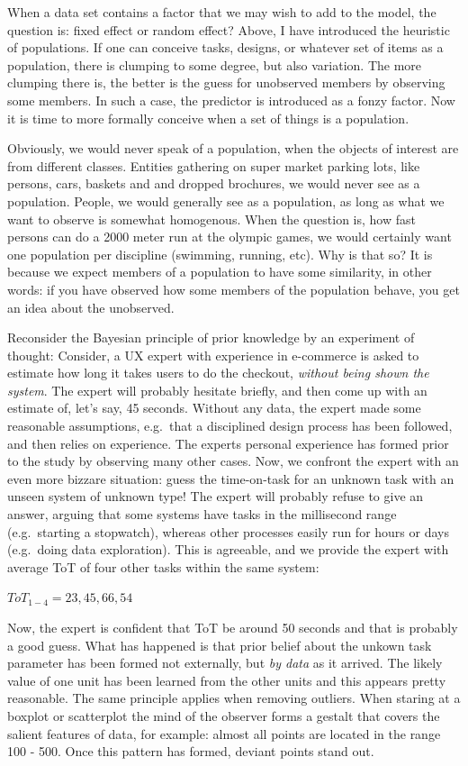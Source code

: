 \documentclass[]{svmono}
\begin{document}
When a data set contains a factor that we may wish to add to the model,
the question is: fixed effect or random effect? Above, I have introduced
the heuristic of populations. If one can conceive tasks, designs, or
whatever set of items as a population, there is clumping to some degree,
but also variation. The more clumping there is, the better is the guess
for unobserved members by observing some members. In such a case, the
predictor is introduced as a fonzy factor. Now it is time to more
formally conceive when a set of things is a population.

Obviously, we would never speak of a population, when the objects of
interest are from different classes. Entities gathering on super market
parking lots, like persons, cars, baskets and and dropped brochures, we
would never see as a population. People, we would generally see as a
population, as long as what we want to observe is somewhat homogenous.
When the question is, how fast persons can do a 2000 meter run at the
olympic games, we would certainly want one population per discipline
(swimming, running, etc). Why is that so? It is because we expect
members of a population to have some similarity, in other words: if you
have observed how some members of the population behave, you get an idea
about the unobserved.

Reconsider the Bayesian principle of prior knowledge by an experiment of
thought: Consider, a UX expert with experience in e-commerce is asked to
estimate how long it takes users to do the checkout, \emph{without being
shown the system}. The expert will probably hesitate briefly, and then
come up with an estimate of, let's say, 45 seconds. Without any data,
the expert made some reasonable assumptions, e.g.~that a disciplined
design process has been followed, and then relies on experience. The
experts personal experience has formed prior to the study by observing
many other cases. Now, we confront the expert with an even more bizzare
situation: guess the time-on-task for an unknown task with an unseen
system of unknown type! The expert will probably refuse to give an
answer, arguing that some systems have tasks in the millisecond range
(e.g.~starting a stopwatch), whereas other processes easily run for
hours or days (e.g.~doing data exploration). This is agreeable, and we
provide the expert with average ToT of four other tasks within the same
system:

\(ToT_{1-4} = {23, 45, 66, 54}\)

Now, the expert is confident that ToT be around 50 seconds and that is
probably a good guess. What has happened is that prior belief about the
unkown task parameter has been formed not externally, but \emph{by data}
as it arrived. The likely value of one unit has been learned from the
other units and this appears pretty reasonable. The same principle
applies when removing outliers. When staring at a boxplot or scatterplot
the mind of the observer forms a gestalt that covers the salient
features of data, for example: almost all points are located in the
range 100 - 500. Once this pattern has formed, deviant points stand out.
\end{document}
